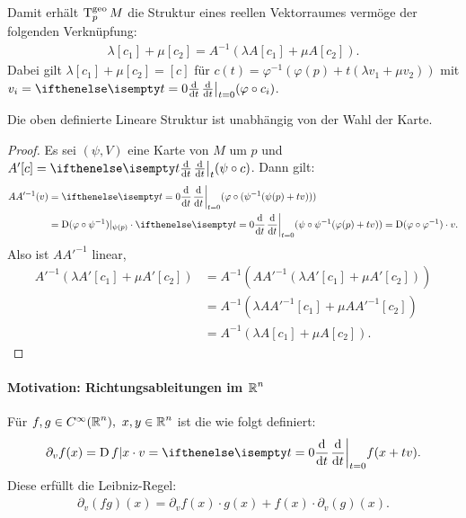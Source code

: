 Damit erhält $\operatorname{T}_p^{\text{geo}}M$ die Struktur eines reellen Vektorraumes vermöge der folgenden Verknüpfung:
\begin{align*}
  \lambda[c_1] + \mu[c_2] = A^{-1}(\lambda A[c_1]+ \mu A[c_2]).
\end{align*}
Dabei gilt $\lambda[c_1]+\mu[c_2] = [c]$ für $c(t) = \varphi^{-1}(\varphi(p) + t(\lambda v_1 + \mu v_2))$ mit $v_i = \difffrac[t=0]{}{t}(\varphi \circ c_i)$.

\begin{Lemma}
  Die oben definierte Lineare Struktur ist unabhängig von der Wahl der Karte.
\end{Lemma}

\begin{proof}
  Es sei $(\psi, V)$ eine Karte von $M$ um $p$ und $A'[c] = \difffrac[t]{}{t}(\psi \circ c)$. Dann gilt:
  \begin{align*}
    A A'^{-1}(v) & = \difffrac[t=0]{}{t}(\varphi \circ (\psi^{-1} (\psi(p) + tv)))\\
    & = \D(\varphi \circ \psi^{-1})|_{\psi(p)} \cdot \difffrac[t=0]{}{t}(\psi \circ \psi^{-1}(\varphi(p) + tv)) = \D (\varphi \circ \varphi^{-1}) \cdot v.
  \end{align*}
  Also ist $A A'^{-1}$ linear,
  \begin{align*}
    A'^{-1}(\lambda A'[c_1] + \mu A'[c_2]) & = A^{-1}(A A'^{-1}(\lambda A'[c_1] + \mu A'[c_2]))\\
    & = A^{-1} (\lambda A A'^{-1}[c_1] + \mu A A'^{-1} [c_2])\\
    & = A^{-1}(\lambda A [c_1] + \mu A [c_2]).
  \end{align*}
\end{proof}



\paragraph{Motivation: Richtungsableitungen im $\operatorname{\mathbb{R}}^n$}\hfill
\begin{Bem}
  
  Für $f,g \in C^{\infty}(\operatorname{\mathbb{R}}^n), \ x,y \in \operatorname{\mathbb{R}}^n$ ist die  wie folgt definiert:
  \begin{align*}
    \partial_vf(x) = \D f|x \cdot v = \difffrac[t=0]{}{t}f(x+tv).
  \end{align*}
  Diese erfüllt die Leibniz-Regel:
  \begin{align*}
    \partial_v(fg)(x) = \partial_vf(x)\cdot g(x) + f(x) \cdot \partial_v(g)(x).
  \end{align*}
\end{Bem}

